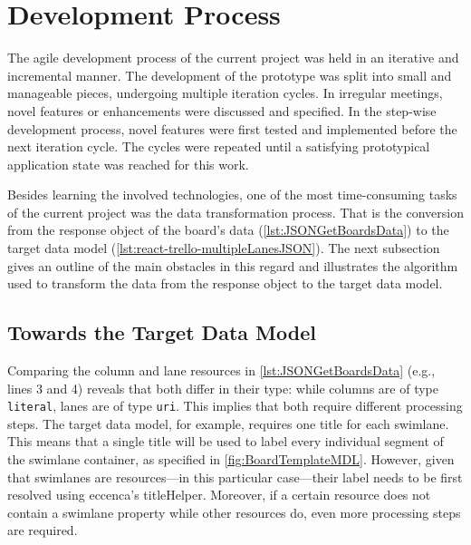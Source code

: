 \section{Development Process}\label{sec:DevProcess}

The agile development process of the current project was held in an iterative and incremental manner. The development of the prototype was split into small and manageable pieces, undergoing multiple iteration cycles. In irregular meetings, novel features or enhancements were discussed and specified. In the step-wise development process, novel features were first tested and implemented before the next iteration cycle. The cycles were repeated until a satisfying prototypical application state was reached for this work.

Besides learning the involved technologies, one of the most time-consuming tasks of the current project was the data transformation process. That is the conversion from the response object of the board’s data (\autoref{lst:JSONGetBoardsData}) to the target data model (\autoref{lst:react-trello-multipleLanesJSON}). The next subsection gives an outline of the main obstacles in this regard and illustrates the algorithm used to transform the data from the response object to the target data model.


\subsection{Towards the Target Data Model}\label{ssec:DataTransformation}

Comparing the column and lane resources in \autoref{lst:JSONGetBoardsData} (e.g., lines 3 and 4) reveals that both differ in their type: while columns are of type \texttt{literal}, lanes are of type \texttt{uri}. This implies that both require different processing steps. The target data model, for example, requires one title for each swimlane. This means that a single title will be used to label every individual segment of the swimlane container, as specified in \autoref{fig:BoardTemplateMDL}. However, given that swimlanes are resources—in this particular case—their label needs to be first resolved using eccenca’s titleHelper. Moreover, if a certain resource does not contain a swimlane property while other resources do, even more processing steps are required.

